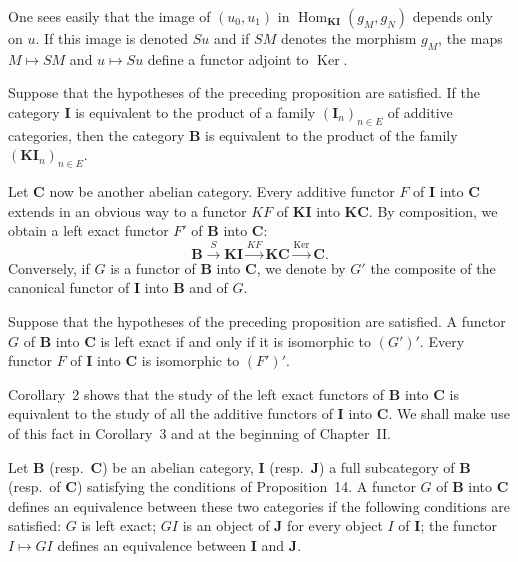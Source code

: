 One sees easily that the image of $(u_0,u_1)$ in
$\operatorname{Hom}_{\mathbf{KI}}(g_M,g_N)$ depends only on $u$. If this image
is denoted $Su$ and if $SM$ denotes the morphism $g_M$, the maps
$M\mapsto SM$ and $u\mapsto Su$ define a functor adjoint to
$\operatorname{Ker}$.

\begin{corollary}
Suppose that the hypotheses of the preceding proposition are satisfied. If
the category $\mathbf{I}$ is equivalent to the product of a family
$(\mathbf{I}_n)_{n\in E}$ of additive categories, then the category
$\mathbf{B}$ is equivalent to the product of the family
$(\mathbf{KI}_n)_{n\in E}$.
\end{corollary}

Let $\mathbf{C}$ now be another abelian category. Every additive functor $F$
of $\mathbf{I}$ into $\mathbf{C}$ extends in an obvious way to a functor $KF$
of $\mathbf{KI}$ into $\mathbf{KC}$. By composition, we obtain a left exact
functor $F'$ of $\mathbf{B}$ into $\mathbf{C}$:
\[
  \mathbf{B} \xrightarrow{S} \mathbf{KI} \xrightarrow{KF} \mathbf{KC}
  \xrightarrow{\operatorname{Ker}} \mathbf{C}.
\]
Conversely, if $G$ is a functor of $\mathbf{B}$ into $\mathbf{C}$, we denote by
$G'$ the composite of the canonical functor of $\mathbf{I}$ into $\mathbf{B}$
and of $G$.

\begin{corollary}
Suppose that the hypotheses of the preceding proposition are satisfied. A
functor $G$ of $\mathbf{B}$ into $\mathbf{C}$ is left exact if and only if it
is isomorphic to $(G')'$. Every functor $F$ of $\mathbf{I}$ into $\mathbf{C}$
is isomorphic to $(F')'$.
\end{corollary}

Corollary~2 shows that the study of the left exact functors of $\mathbf{B}$
into $\mathbf{C}$ is equivalent to the study of all the additive functors of
$\mathbf{I}$ into $\mathbf{C}$. We shall make use of this fact in
Corollary~3 and at the beginning of Chapter~II.

\begin{corollary}
Let $\mathbf{B}$ (resp.\ $\mathbf{C}$) be an abelian category, $\mathbf{I}$
(resp.\ $\mathbf{J}$) a full subcategory of $\mathbf{B}$ (resp.\ of
$\mathbf{C}$) satisfying the conditions of Proposition~14. A functor $G$ of
$\mathbf{B}$ into $\mathbf{C}$ defines an equivalence between these two
categories if the following conditions are satisfied: $G$ is left exact;
$GI$ is an object of $\mathbf{J}$ for every object $I$ of $\mathbf{I}$; the
functor $I\mapsto GI$ defines an equivalence between $\mathbf{I}$ and
$\mathbf{J}$.
\end{corollary}


